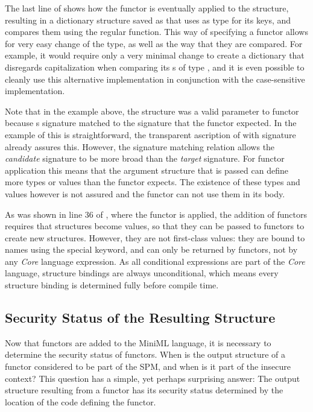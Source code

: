 The last line of  shows how the functor  is eventually applied to the  structure, resulting in a dictionary structure saved as  that uses  as type for its keys, and compares them using the regular  function.
This way of specifying a functor allows for very easy change of the  type, as well as the way that they are compared.
For example, it would require only a very minimal change to create a dictionary that disregards capitalization when comparing its s of type , and it is even possible to cleanly use this alternative implementation in conjunction with the case-sensitive implementation.

\smallskip

\noindent Note that in the example above, the structure  was a valid parameter to functor  because s signature matched to the  signature that the functor expected. In the example of  this is straightforward, the transparent ascription of  with signature  already assures this.
However, the signature matching relation allows the \emph{candidate} signature to be more broad than the \emph{target} signature.
For functor application this means that the argument structure that is passed can define more types or values than the functor expects.
The existence of these types and values however is not assured and the functor can not use them in its body. 

\smallskip

As was shown in line 36 of , where the  functor is applied, the addition of functors requires that structures become values, so that they can be passed to functors to create new structures.
However, they are not first-class values: they are bound to names using the special  keyword, and can only be returned by functors, not by any \emph{Core} language expression.
As all conditional expressions are part of the \emph{Core} language, structure bindings are always unconditional, which means every structure binding is determined fully before compile time.

\subsection{Security Status of the Resulting Structure}
\label{sec:FunctorSecurityStatus}
Now that functors are added to the MiniML language, it is necessary to determine the security status of functors. 
When is the output structure of a functor considered to be part of the SPM, and when is it part of the insecure context?
This question has a simple, yet perhaps surprising answer:
The output structure resulting from a functor has its security status determined by the location of the code defining the functor.

